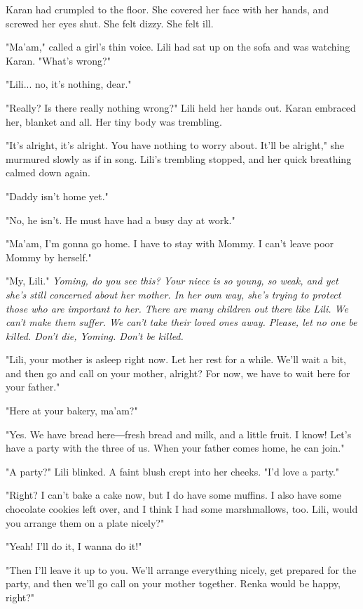 Karan had crumpled to the floor. She covered her face with her hands,
and screwed her eyes shut. She felt dizzy. She felt ill.

"Ma'am," called a girl's thin voice. Lili had sat up on the sofa and was
watching Karan. "What's wrong?"

"Lili... no, it's nothing, dear."

"Really? Is there really nothing wrong?" Lili held her hands out. Karan
embraced her, blanket and all. Her tiny body was trembling.

"It's alright, it's alright. You have nothing to worry about. It'll be
alright," she murmured slowly as if in song. Lili's trembling stopped,
and her quick breathing calmed down again.

"Daddy isn't home yet."

"No, he isn't. He must have had a busy day at work."

"Ma'am, I'm gonna go home. I have to stay with Mommy. I can't leave poor
Mommy by herself."

"My, Lili." \emph{Yoming, do you see this? Your niece is so young, so weak,
	and yet she's still concerned about her mother. In her own way, she's
	trying to protect those who are important to her. There are many
	children out there like Lili. We can't make them suffer. We can't take
	their loved ones away. Please, let no one be killed. Don't die, Yoming.
	Don't be killed.}

"Lili, your mother is asleep right now. Let her rest for a while. We'll
wait a bit, and then go and call on your mother, alright? For now, we
have to wait here for your father."

"Here at your bakery, ma'am?"

"Yes. We have bread here―fresh bread and milk, and a little fruit. I
know! Let's have a party with the three of us. When your father comes
home, he can join."

"A party?" Lili blinked. A faint blush crept into her cheeks. "I'd love
a party."

"Right? I can't bake a cake now, but I do have some muffins. I also have
some chocolate cookies left over, and I think I had some marshmallows,
too. Lili, would you arrange them on a plate nicely?"

"Yeah! I'll do it, I wanna do it!"

"Then I'll leave it up to you. We'll arrange everything nicely, get
prepared for the party, and then we'll go call on your mother together.
Renka would be happy, right?"

